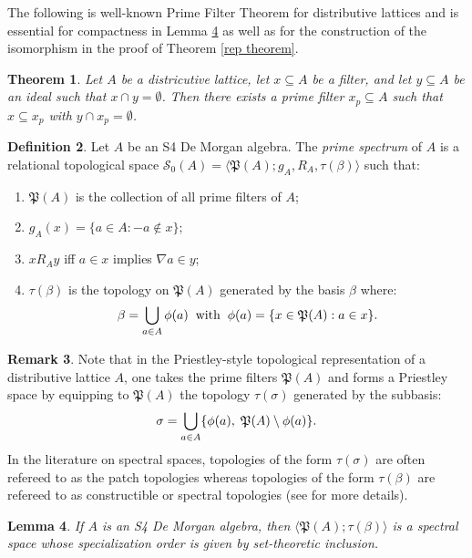 \documentclass{amsart}
\theoremstyle{plain}
\newtheorem{theorem}{Theorem}[section]
\newtheorem{lemma}[theorem]{Lemma}
\theoremstyle{definition}
\newtheorem{definition}[theorem]{Definition}
\newtheorem{remark}[theorem]{Remark}
\begin{document}
 The following is well-known Prime Filter Theorem for distributive lattices and is essential for compactness in Lemma \ref{lemma 3.8} as well as for the construction of the isomorphism in the proof of Theorem \ref{rep theorem}.  
 \begin{theorem}
     Let $A$ be a districutive lattice, let $x\subseteq A$ be a filter, and let $y\subseteq A$ be an ideal such that $x\cap y=\emptyset$. Then there exists a prime filter $x_p\subseteq A$ such that $x\subseteq x_p$ with $y\cap x_p=\emptyset$. 
 \end{theorem}
\begin{definition}\label{prime spectrum}
    Let $A$ be an S4 De Morgan algebra. The \emph{prime spectrum} of $A$ is a relational topological space $\mathcal{S}_0(A)=\langle\mathfrak{P}(A); g_A,R_A,\tau(\beta)\rangle$ such that: 
    \begin{enumerate}
        \item $\mathfrak{P}(A)$ is the collection of all prime filters of $A$; 
        \item $g_A(x)=\{a\in A:-a\not\in x\}$; 
        \item $xR_Ay$ iff $a\in x$ implies $\nabla a\in y$; 
        \item $\tau(\beta)$ is the topology on $\mathfrak{P}(A)$ generated by the basis $\beta$ where: 
        \[\beta=\bigcup_{a\in A}\phi(a)\hspace{.2cm}\text{with}\hspace{.2cm}\phi(a)=\{x\in\mathfrak{P}(A):a\in x\}.\]
    \end{enumerate}
\end{definition}
\begin{remark}
    Note that in the Priestley-style topological representation of a distributive lattice $A$, one takes the prime filters $\mathfrak{P}(A)$ and forms a Priestley space by equipping to $\mathfrak{P}(A)$ the topology $\tau(\sigma)$ generated by the subbasis: 
    \[\sigma=\bigcup_{a\in A}\{\phi(a),\hspace{.1cm}\mathfrak{P}(A)\setminus\phi(a)\}.\] In the literature on spectral spaces, topologies of the form $\tau(\sigma)$ are often refereed to as the patch topologies whereas topologies of the form $\tau(\beta)$ are refereed to as constructible or spectral topologies (see \cite{dic} for more details). 
\end{remark}
\begin{lemma}\label{lemma 3.8}
    If $A$ is an S4 De Morgan algebra, then $\langle\mathfrak{P}(A);\tau(\beta)\rangle$ is a spectral space whose specialization order is given by set-theoretic inclusion.  
\end{lemma}
\end{document}
